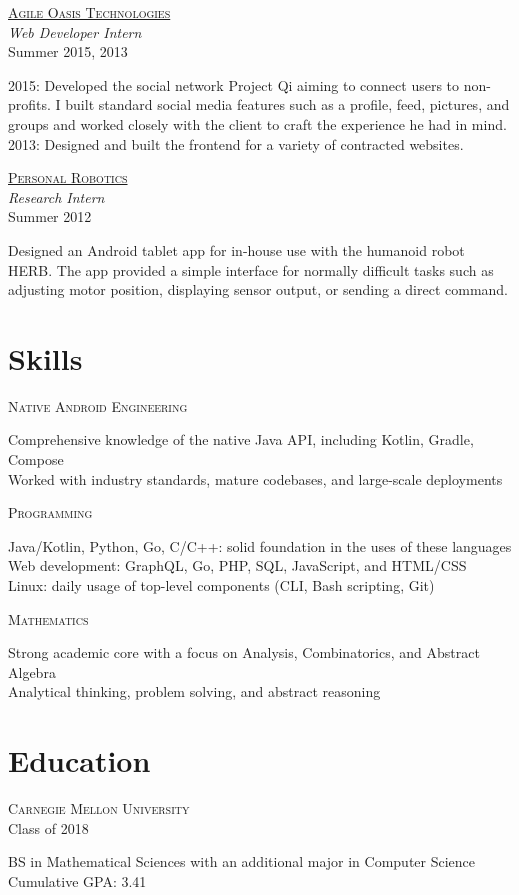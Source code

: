 \documentclass[letterpaper,10pt]{article}
\newcommand{\lb}{\vspace{4pt} \\}
\newenvironment{resumecols1}[1]
{
    \vspace{.1cm}
    \begin{minipage}[t]{.21\linewidth}
        \begin{flushright}
            \textsc{#1}
        \end{flushright}
    \end{minipage}
    \hspace{.005\linewidth}
    \begin{minipage}[t]{.77\linewidth}
}
{
    \end{minipage}
    \vspace{.1cm}
}
\newenvironment{resumecols2}[2]
{
    \vspace{.1cm}
    \begin{minipage}[t]{.21\linewidth}
        \begin{flushright}
            \textsc{#1} \\
            \small{#2}
        \end{flushright}
    \end{minipage}
    \hspace{.005\linewidth}
    \begin{minipage}[t]{.77\linewidth}
}
{
    \end{minipage}
    \vspace{.1cm}
}
\newenvironment{resumecols}[4]
{
    \vspace{.1cm}
    \begin{minipage}[t]{.21\linewidth}
        \begin{flushright}
            \href{#2}{\textsc{#1}} \\
            \small{\textit{#3}} \\
            \small{#4}
        \end{flushright}
    \end{minipage}
    \hspace{.005\linewidth}
    \begin{minipage}[t]{.77\linewidth}
}
{
    \end{minipage}
    \vspace{.1cm}
}
\begin{document}
\begin{resumecols}{Agile Oasis Technologies}{http://agileoasis.com}{Web Developer Intern}{Summer 2015, 2013}
    2015: Developed the social network Project Qi aiming to connect users to non-profits. I built standard social media features such as a profile, feed, pictures, and groups and worked closely with the client to craft the experience he had in mind.
    \lb
    2013: Designed and built the frontend for a variety of contracted websites.
\end{resumecols}

\begin{resumecols}{Personal Robotics}{https://personalrobotics.cs.washington.edu}{Research Intern}{Summer 2012}
    Designed an Android tablet app for in-house use with the humanoid robot HERB. The app provided a simple interface for normally difficult tasks such as adjusting motor position, displaying sensor output, or sending a direct command.
\end{resumecols}

\section{Skills}

\begin{resumecols1}{Native Android Engineering}
    Comprehensive knowledge of the native Java API, including Kotlin, Gradle, Compose \\
    Worked with industry standards, mature codebases, and large-scale deployments
\end{resumecols1}

\begin{resumecols1}{Programming}
    Java/Kotlin, Python, Go, C/C++: solid foundation in the uses of these languages \\
    Web development: GraphQL, Go, PHP, SQL, JavaScript, and HTML/CSS \\
    Linux: daily usage of top-level components (CLI, Bash scripting, Git)
\end{resumecols1}

\begin{resumecols1}{Mathematics}
    Strong academic core with a focus on Analysis, Combinatorics, and Abstract Algebra \\
    Analytical thinking, problem solving, and abstract reasoning
\end{resumecols1}

\section{Education}

\begin{resumecols2}{Carnegie Mellon University}{Class of 2018}
    BS in Mathematical Sciences with an additional major in Computer Science
    \lb
    Cumulative GPA: 3.41
\end{resumecols2}
\end{document}

